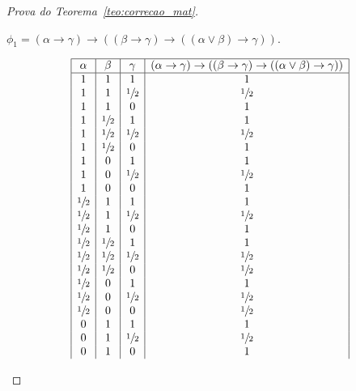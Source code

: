 \begin{proof}[Prova do Teorema~\ref{teo:correcao_mat}]
\begin{provaporcasos}
\begin{provaporsubcasos}
                \subcasodeprova{} $\phi_{1} = (\alpha \to \gamma) \to ((\beta \to \gamma) \to ((\alpha \lor \beta) \to \gamma))$. 

                \begin{center}
                    \[
                        \begin{array}{|c|c|c|c|}%
                            \hline
                            \alpha      & \beta & \gamma & (\alpha \to \gamma) \to ((\beta \to \gamma) \to ((\alpha \lor \beta) \to \gamma)) \\
                            \hline%
                            1 & 1 & 1 &1\\
                            1 & 1 & \meio{} &\meio{}\\
                            1 & 1 & 0 &1\\
                            1 & \meio{} & 1 &1\\
                            1 & \meio{} & \meio{} &\meio{}\\
                            1 & \meio{} & 0 &1\\
                            1 & 0 & 1 &1\\
                            1 & 0 & \meio{} &\meio{}\\
                            1 & 0 & 0 &1\\
                            \meio{} & 1 & 1 &1\\
                            \meio{} & 1 & \meio{} &\meio{}\\
                            \meio{} & 1 & 0 &1\\
                            \meio{} & \meio{} & 1 &1\\
                            \meio{} & \meio{} & \meio{} &\meio{}\\
                            \meio{} & \meio{} & 0 &\meio{}\\
                            \meio{} & 0 & 1 &1\\
                            \meio{} & 0 & \meio{} &\meio{}\\
                            \meio{} & 0 & 0 &\meio{}\\
                            0 & 1 & 1 &1\\
                            0 & 1 & \meio{} &\meio{}\\
                            0 & 1 & 0 &1\\

\end{array}\]
\end{center}
\end{provaporsubcasos}
\end{provaporcasos}
\end{proof}
